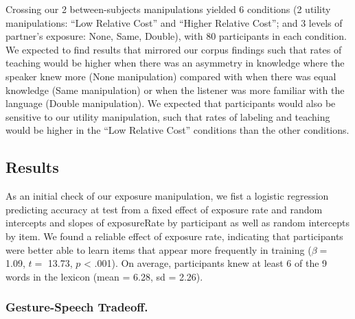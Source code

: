 \documentclass[english,,man,floatsintext]{apa6}
\begin{document}
Crossing our 2 between-subjects manipulations yielded 6 conditions (2 utility manipulations: \enquote{Low Relative Cost} and \enquote{Higher Relative Cost}; and 3 levels of partner's exposure: None, Same, Double), with 80 participants in each condition. We expected to find results that mirrored our corpus findings such that rates of teaching would be higher when there was an asymmetry in knowledge where the speaker knew more (None manipulation) compared with when there was equal knowledge (Same manipulation) or when the listener was more familiar with the language (Double manipulation). We expected that participants would also be sensitive to our utility manipulation, such that rates of labeling and teaching would be higher in the \enquote{Low Relative Cost} conditions than the other conditions.

\hypertarget{results-1}{%
\subsection{Results}\label{results-1}}

As an initial check of our exposure manipulation, we fist a logistic regression predicting accuracy at test from a fixed effect of exposure rate and random intercepts and slopes of exposureRate by participant as well as random intercepts by item. We found a reliable effect of exposure rate, indicating that participants were better able to learn items that appear more frequently in training (\(\beta =\) 1.09, \(t =\) 13.73, \(p\) \textless{} .001). On average, participants knew at least 6 of the 9 words in the lexicon (mean = 6.28, sd = 2.26).

\hypertarget{gesture-speech-tradeoff.}{%
\subsubsection{Gesture-Speech Tradeoff.}\label{gesture-speech-tradeoff.}}
\end{document}
